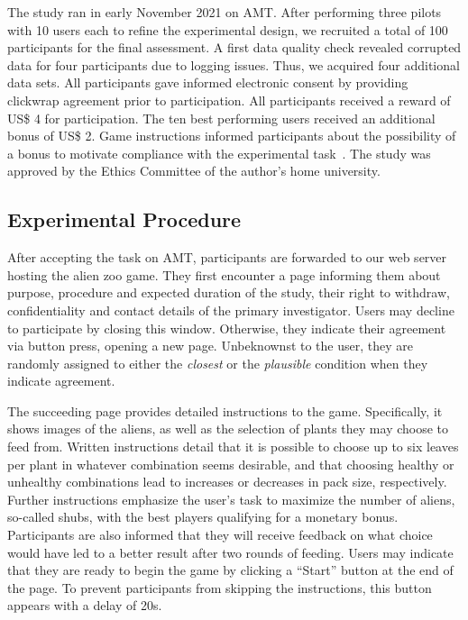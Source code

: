 The study ran in early November 2021 on \gls{AMT}.
After performing three pilots with 10 users each to refine the experimental design, we recruited a total of 100 participants for the final assessment. %
A first data quality check revealed corrupted data for four participants due to logging issues. Thus, we acquired four additional data sets. 
All participants gave informed electronic consent by providing clickwrap agreement prior to participation.
All participants received a reward of US\$ 4 for participation. 
The ten best performing users received an additional bonus of US\$ 2. 
Game instructions informed participants about the possibility of a bonus to motivate compliance with the experimental task~\citep{bansal_updates_2019}.
The study was approved by the Ethics Committee of the author's home university.

\subsection{Experimental Procedure}\label{subsec:experimental-procedure}

After accepting the task on \gls{AMT}, participants are forwarded to our web server hosting the alien zoo game.
They first encounter a page informing them about purpose, procedure and expected duration of the study, their right to withdraw, confidentiality and contact details of the primary investigator.
Users may decline to participate by closing this window.
Otherwise, they indicate their agreement via button press, opening a new page.
Unbeknownst to the user, they are randomly assigned to either the \textit{closest} or the \textit{plausible} condition when they indicate agreement.

The succeeding page provides detailed instructions to the game. 
Specifically, it shows images of the aliens, as well as the selection of plants they may choose to feed from.
Written instructions detail that it is possible to choose up to six leaves per plant in whatever combination seems desirable, and that choosing healthy or unhealthy combinations lead to increases or decreases in pack size, respectively.
Further instructions emphasize the user's task to maximize the number of aliens, so-called shubs, with the best players qualifying for a monetary bonus.
Participants are also informed that they will receive feedback on what choice would have led to a better result after two rounds of feeding.
Users may indicate that they are ready to begin the game by clicking a ``Start'' button at the end of the page.
To prevent participants from skipping the instructions, this button appears with a delay of 20s.

